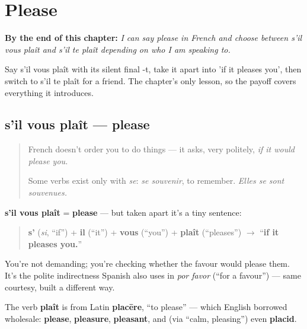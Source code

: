 
\chapter{Please}
\label{ch:fr-please}

\begin{chapteropening}
\textbf{By the end of this chapter:} \emph{I can say please in French and choose between s'il vous plaît and s'il te plaît depending on who I am speaking to.}

Say s'il vous plaît with its silent final -t, take it apart into 'if it pleases you', then switch to s'il te plaît for a friend. The chapter's only lesson, so the payoff covers everything it introduces.
\end{chapteropening}

\section[s'il vous plaît]{s'il vous plaît — please}

\label{lesson:FR-C19-sil-vous-plait}



\begin{quote}
French doesn't order you to do things — it asks, very politely, \emph{if it would please you.}

Some verbs exist only with \emph{se}: \emph{se souvenir}, to remember. \emph{Elles se sont souvenues.}
\end{quote}

\begin{cousinweb}
\textbf{s'il vous plaît} = \textbf{please} — but taken apart it's a tiny sentence:

\begin{quote}
\textbf{s'} (\emph{si}, \textquotedblleft{}if\textquotedblright{}) + \textbf{il} (\textquotedblleft{}it\textquotedblright{}) + \textbf{vous} (\textquotedblleft{}you\textquotedblright{}) + \textbf{plaît} (\textquotedblleft{}pleases\textquotedblright{}) $\to$ \textquotedblleft{}\textbf{if it pleases you.}\textquotedblright{}
\end{quote}

You're not demanding; you're checking whether the favour would please them. It's the polite indirectness Spanish also uses in \emph{por favor} (\textquotedblleft{}for a favour\textquotedblright{}) — same courtesy, built a different way.

The verb \textbf{plaît} is from Latin \textbf{placēre}, \textquotedblleft{}to please\textquotedblright{} — which English borrowed wholesale: \textbf{please}, \textbf{pleasure}, \textbf{pleasant}, and (via \textquotedblleft{}calm, pleasing\textquotedblright{}) even \textbf{placid}.
\end{cousinweb}

